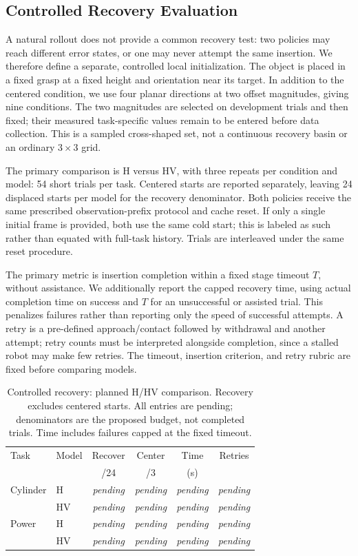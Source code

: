 \documentclass[letterpaper,10pt,conference]{ieeeconf}
\newcommand{\pending}{\textit{pending}}
\begin{document}
\subsection{Controlled Recovery Evaluation}
A natural rollout does not provide a common recovery test: two policies may reach different error states, or one may never attempt the same insertion. We therefore define a separate, controlled local initialization. The object is placed in a fixed grasp at a fixed height and orientation near its target. In addition to the centered condition, we use four planar directions at two offset magnitudes, giving nine conditions. The two magnitudes are selected on development trials and then fixed; their measured task-specific values remain to be entered before data collection. This is a sampled cross-shaped set, not a continuous recovery basin or an ordinary $3\times3$ grid.

The primary comparison is H versus HV, with three repeats per condition and model: 54 short trials per task. Centered starts are reported separately, leaving 24 displaced starts per model for the recovery denominator. Both policies receive the same prescribed observation-prefix protocol and cache reset. If only a single initial frame is provided, both use the same cold start; this is labeled as such rather than equated with full-task history. Trials are interleaved under the same reset procedure.

The primary metric is insertion completion within a fixed stage timeout $T$, without assistance. We additionally report the capped recovery time, using actual completion time on success and $T$ for an unsuccessful or assisted trial. This penalizes failures rather than reporting only the speed of successful attempts. A retry is a pre-defined approach/contact followed by withdrawal and another attempt; retry counts must be interpreted alongside completion, since a stalled robot may make few retries. The timeout, insertion criterion, and retry rubric are fixed before comparing models.

\begin{table}[t]
\centering\small
\caption{Controlled recovery: planned H/HV comparison. Recovery excludes centered starts. All entries are pending; denominators are the proposed budget, not completed trials. Time includes failures capped at the fixed timeout.}
\label{tab:recovery}
\setlength{\tabcolsep}{3.5pt}
\begin{tabular}{llcccc}
\toprule
Task & Model & Recover & Center & Time & Retries \\
 & & /24 & /3 & (s) & \\
\midrule
Cylinder & H & \pending & \pending & \pending & \pending \\
 & HV & \pending & \pending & \pending & \pending \\
Power & H & \pending & \pending & \pending & \pending \\
 & HV & \pending & \pending & \pending & \pending \\
\bottomrule
\end{tabular}
\end{table}
\end{document}
